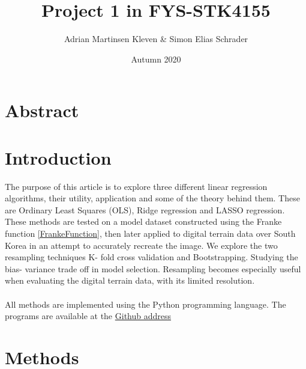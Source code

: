 \documentclass[11pt,a4paper,titlepage]{article}
\title{Project 1 in FYS-STK4155}
\author{Adrian Martinsen Kleven & Simon Elias Schrader }
\date{Autumn 2020}
\begin{document}
\tableofcontents
\listoffigures
\listoftables

\clearpage
\section{Abstract}




\section{Introduction}
The purpose of this article is to explore three different linear regression algorithms, their utility, application and some of the theory behind them. These are Ordinary Least Squares (OLS), Ridge regression and LASSO regression. These methods are tested on a model dataset constructed using the Franke function \eqref{FrankeFunction}, then later applied to digital terrain data over South Korea in an attempt to accurately recreate the image. We explore the two resampling techniques K- fold cross validation and Bootstrapping. Studying the bias- variance trade off in model selection. Resampling becomes especially useful when evaluating the digital terrain data, with its limited resolution.\\\\All methods are implemented using the Python programming language. The programs are available at the \href{https://github.com/schraderSimon/FYS-STK/tree/master/project1}{Github address}
\section{Methods}
\end{document}
